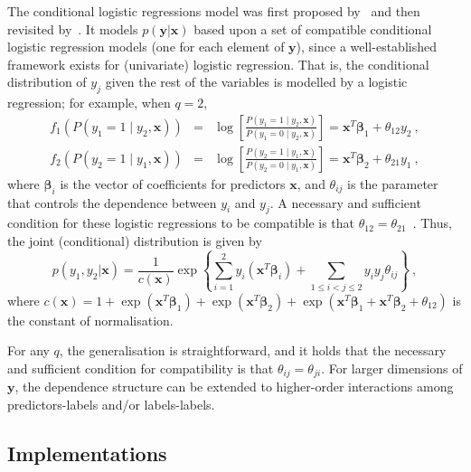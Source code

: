 \documentclass[review]{elsarticle}
\begin{document}
The conditional logistic regressions model was first proposed by~\citet{JOE} and then revisited by~\citet{MVB}. It models $p(\mathbf{y}|\mathbf{x})$ based upon a set of compatible conditional logistic regression models (one for each element of $\mathbf{y}$), since a well-established framework exists for (univariate) logistic regression. That is, the conditional distribution of $y_{j}$ given the rest of the variables is modelled by a logistic regression; for example, when $q=2$,
\begin{eqnarray*}
f_1 \left( P(y_{1} = 1 \mid y_{2},\mathbf{x}) \right) &=& \log \left[ \frac{P(y_{1} = 1\mid y_{2},\mathbf{x})}{P(y_{1} = 0\mid y_{2},\mathbf{x})} \right] = \mathbf{x}^T\bm{\beta} _{1} + \theta_{12}y_{2}\ , \\
f_2 \left( P(y_{2} = 1 \mid y_{1},\mathbf{x}) \right) &=& \log \left[ \frac{P(y_{2} = 1\mid y_{1},\mathbf{x})}{P(y_{2} = 0\mid y_{1},\mathbf{x})} \right] = \mathbf{x}^T\bm{\beta} _{2} + \theta_{21}y_{1}\ ,
\end{eqnarray*}
where $\bm{\beta}_{i}$ is the vector of coefficients for predictors $\mathbf{x}$, and $\theta_{ij}$ is the parameter that controls the dependence between $y_{i}$ and $y_{j}$. A necessary and sufficient condition for these logistic regressions to be compatible is that $\theta_{12} = \theta_{21}$~\citep{JOE}. Thus, the joint (conditional) distribution is given by
\begin{equation} \label{JC}
p(y_{1},y_{2}|\mathbf{x}) = \frac{1}{c(\mathbf{x})} \exp \left \{ \sum^{2}_{i=1}{y_{i} \left( \mathbf{x}^T \bm{\beta}_{i} \right)} + \sum_{1 \leq i < j \leq 2}{y_{i}y_{j}\theta_{ij}} \right\}\ ,
\end{equation}
where $c(\mathbf{x}) = 1 + \exp(\mathbf{x}^T\bm{\beta}_{1}) + \exp(\mathbf{x}^T\bm{\beta}_{2}) + \exp(\mathbf{x}^T\bm{\beta}_{1}+\mathbf{x}^T\bm{\beta}_{2} + \theta_{12})$ is the constant of normalisation.

For any $q$, the generalisation is straightforward, and it holds that the necessary and sufficient condition for compatibility is that $\theta_{ij} = \theta_{ji}$. For larger dimensions of $\mathbf{y}$, the dependence structure can be extended to higher-order interactions among predictors-labels and/or labels-labels.

\subsection{Implementations}
\end{document}
